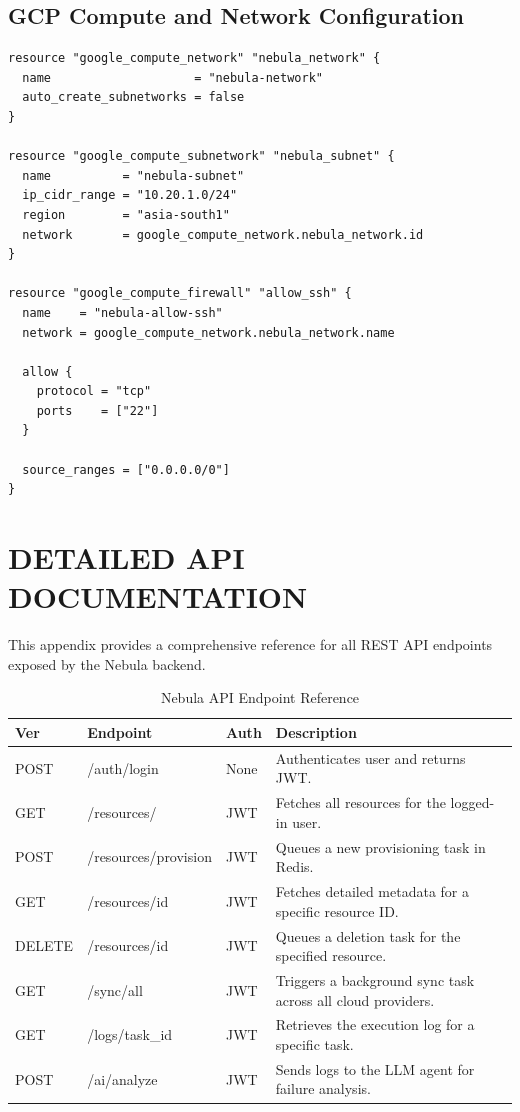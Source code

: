 \section{GCP Compute and Network Configuration}
\begin{lstlisting}[language=XML, caption=GCP Infrastructure (main.tf)]
resource "google_compute_network" "nebula_network" {
  name                    = "nebula-network"
  auto_create_subnetworks = false
}

resource "google_compute_subnetwork" "nebula_subnet" {
  name          = "nebula-subnet"
  ip_cidr_range = "10.20.1.0/24"
  region        = "asia-south1"
  network       = google_compute_network.nebula_network.id
}

resource "google_compute_firewall" "allow_ssh" {
  name    = "nebula-allow-ssh"
  network = google_compute_network.nebula_network.name

  allow {
    protocol = "tcp"
    ports    = ["22"]
  }

  source_ranges = ["0.0.0.0/0"]
}
\end{lstlisting}

\newpage
\chapter{DETAILED API DOCUMENTATION}

This appendix provides a comprehensive reference for all REST API endpoints exposed by the Nebula backend.

\begin{table}[H]
\centering
\caption{Nebula API Endpoint Reference}
\label{tab:api_ref}
\begin{tabular}{|p{1cm}|p{3.5cm}|p{2.5cm}|p{5cm}|}
\hline
\textbf{Ver} & \textbf{Endpoint} & \textbf{Auth} & \textbf{Description} \\ \hline
POST & /auth/login & None & Authenticates user and returns JWT. \\ \hline
GET & /resources/ & JWT & Fetches all resources for the logged-in user. \\ \hline
POST & /resources/provision & JWT & Queues a new provisioning task in Redis. \\ \hline
GET & /resources/{id} & JWT & Fetches detailed metadata for a specific resource ID. \\ \hline
DELETE & /resources/{id} & JWT & Queues a deletion task for the specified resource. \\ \hline
GET & /sync/all & JWT & Triggers a background sync task across all cloud providers. \\ \hline
GET & /logs/{task\_id} & JWT & Retrieves the execution log for a specific task. \\ \hline
POST & /ai/analyze & JWT & Sends logs to the LLM agent for failure analysis. \\ \hline
\end{tabular}
\end{table}

